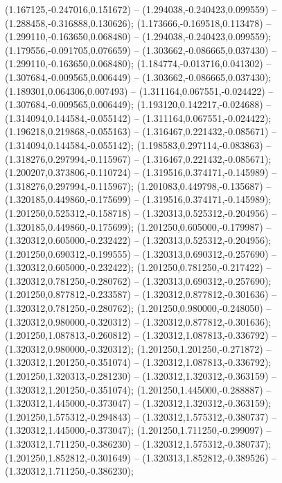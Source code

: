  (1.167125,-0.247016,0.151672) -- (1.294038,-0.240423,0.099559) -- (1.288458,-0.316888,0.130626);
 (1.173666,-0.169518,0.113478) -- (1.299110,-0.163650,0.068480) -- (1.294038,-0.240423,0.099559);
 (1.179556,-0.091705,0.076659) -- (1.303662,-0.086665,0.037430) -- (1.299110,-0.163650,0.068480);
 (1.184774,-0.013716,0.041302) -- (1.307684,-0.009565,0.006449) -- (1.303662,-0.086665,0.037430);
 (1.189301,0.064306,0.007493) -- (1.311164,0.067551,-0.024422) -- (1.307684,-0.009565,0.006449);
 (1.193120,0.142217,-0.024688) -- (1.314094,0.144584,-0.055142) -- (1.311164,0.067551,-0.024422);
 (1.196218,0.219868,-0.055163) -- (1.316467,0.221432,-0.085671) -- (1.314094,0.144584,-0.055142);
 (1.198583,0.297114,-0.083863) -- (1.318276,0.297994,-0.115967) -- (1.316467,0.221432,-0.085671);
 (1.200207,0.373806,-0.110724) -- (1.319516,0.374171,-0.145989) -- (1.318276,0.297994,-0.115967);
 (1.201083,0.449798,-0.135687) -- (1.320185,0.449860,-0.175699) -- (1.319516,0.374171,-0.145989);
 (1.201250,0.525312,-0.158718) -- (1.320313,0.525312,-0.204956) -- (1.320185,0.449860,-0.175699);
 (1.201250,0.605000,-0.179987) -- (1.320312,0.605000,-0.232422) -- (1.320313,0.525312,-0.204956);
 (1.201250,0.690312,-0.199555) -- (1.320313,0.690312,-0.257690) -- (1.320312,0.605000,-0.232422);
 (1.201250,0.781250,-0.217422) -- (1.320312,0.781250,-0.280762) -- (1.320313,0.690312,-0.257690);
 (1.201250,0.877812,-0.233587) -- (1.320312,0.877812,-0.301636) -- (1.320312,0.781250,-0.280762);
 (1.201250,0.980000,-0.248050) -- (1.320312,0.980000,-0.320312) -- (1.320312,0.877812,-0.301636);
 (1.201250,1.087813,-0.260812) -- (1.320312,1.087813,-0.336792) -- (1.320312,0.980000,-0.320312);
 (1.201250,1.201250,-0.271872) -- (1.320312,1.201250,-0.351074) -- (1.320312,1.087813,-0.336792);
 (1.201250,1.320313,-0.281230) -- (1.320312,1.320312,-0.363159) -- (1.320312,1.201250,-0.351074);
 (1.201250,1.445000,-0.288887) -- (1.320312,1.445000,-0.373047) -- (1.320312,1.320312,-0.363159);
 (1.201250,1.575312,-0.294843) -- (1.320312,1.575312,-0.380737) -- (1.320312,1.445000,-0.373047);
 (1.201250,1.711250,-0.299097) -- (1.320312,1.711250,-0.386230) -- (1.320312,1.575312,-0.380737);
 (1.201250,1.852812,-0.301649) -- (1.320313,1.852812,-0.389526) -- (1.320312,1.711250,-0.386230);
